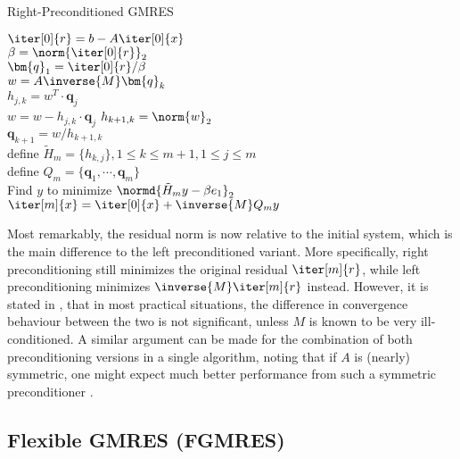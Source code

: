 \begin{algorithm}[h]
  \caption{Right-Preconditioned GMRES}
  \label{alg:predonditioned_gmres}
  \SetAlgoLined
  \DontPrintSemicolon
  $\iter[0]{r} = b-A\iter[0]{x}$ \\
  $\beta = \norm{\iter[0]{r}}_2$ \\
  $\bm{q}_1 = \iter[0]{r}/\beta$ \\
   {
    $w =A\inverse{M} \bm{q}_k$ \\
     {
      $h_{j,k} = w^T\cdot \bm{q}_j$ \\
      $ w = w - h_{j,k}\cdot \bm{q}_j$}
    $h_{k+1,k} = \norm{w}_2$ \\
    $\bm{q}_{k+1} = w/h_{k+1,k}$ \\
  }
  define $\tilde{H}_m = \{h_{k,j}\}, 1 \leq k \leq m+1, 1 \leq j \leq m$ \\
  define $Q_m = \{\bm{q}_1, \cdots, \bm{q}_m\}$ \\
  Find $y$ to minimize $\normd{\tilde{H}_my-\beta e_1}_2$ \\
  $\iter[m]{x} = \iter[0]{x} + \inverse{M}Q_my$
\end{algorithm}

Most remarkably, the residual norm is now relative to the initial system, which is the main difference to the left preconditioned variant. More specifically, right preconditioning still minimizes the original residual $\iter[m]{r}$, while left preconditioning minimizes $\inverse{M}\iter[m]{r}$ instead. However, it is stated in \cite{saad_iterative_2003}, that in most practical situations, the difference in convergence behaviour between the two is not significant, unless $M$ is known to be very ill-conditioned. A similar argument can be made for the combination of both preconditioning versions in a single algorithm, noting that if $A$ is (nearly) symmetric, one might expect much better performance from such a symmetric preconditioner \cite{saad_iterative_2003}.

\subsection{Flexible GMRES (FGMRES)}
\label{sec:fgmres}

